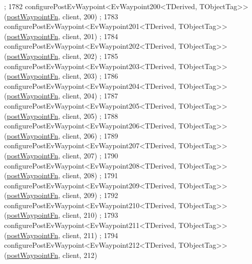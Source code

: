 \begin{DoxyCode}
      ;
1782     configurePostEvWaypoint<EvWaypoint200<TDerived, TObjectTag>>(\hyperlink{classcl__move__base__z_1_1WaypointEventDispatcher_a964a57fcce5d48ec60243230722d8dd7}{postWaypointFn}, client, 200)
      ;
1783     configurePostEvWaypoint<EvWaypoint201<TDerived, TObjectTag>>(\hyperlink{classcl__move__base__z_1_1WaypointEventDispatcher_a964a57fcce5d48ec60243230722d8dd7}{postWaypointFn}, client, 201)
      ;
1784     configurePostEvWaypoint<EvWaypoint202<TDerived, TObjectTag>>(\hyperlink{classcl__move__base__z_1_1WaypointEventDispatcher_a964a57fcce5d48ec60243230722d8dd7}{postWaypointFn}, client, 202)
      ;
1785     configurePostEvWaypoint<EvWaypoint203<TDerived, TObjectTag>>(\hyperlink{classcl__move__base__z_1_1WaypointEventDispatcher_a964a57fcce5d48ec60243230722d8dd7}{postWaypointFn}, client, 203)
      ;
1786     configurePostEvWaypoint<EvWaypoint204<TDerived, TObjectTag>>(\hyperlink{classcl__move__base__z_1_1WaypointEventDispatcher_a964a57fcce5d48ec60243230722d8dd7}{postWaypointFn}, client, 204)
      ;
1787     configurePostEvWaypoint<EvWaypoint205<TDerived, TObjectTag>>(\hyperlink{classcl__move__base__z_1_1WaypointEventDispatcher_a964a57fcce5d48ec60243230722d8dd7}{postWaypointFn}, client, 205)
      ;
1788     configurePostEvWaypoint<EvWaypoint206<TDerived, TObjectTag>>(\hyperlink{classcl__move__base__z_1_1WaypointEventDispatcher_a964a57fcce5d48ec60243230722d8dd7}{postWaypointFn}, client, 206)
      ;
1789     configurePostEvWaypoint<EvWaypoint207<TDerived, TObjectTag>>(\hyperlink{classcl__move__base__z_1_1WaypointEventDispatcher_a964a57fcce5d48ec60243230722d8dd7}{postWaypointFn}, client, 207)
      ;
1790     configurePostEvWaypoint<EvWaypoint208<TDerived, TObjectTag>>(\hyperlink{classcl__move__base__z_1_1WaypointEventDispatcher_a964a57fcce5d48ec60243230722d8dd7}{postWaypointFn}, client, 208)
      ;
1791     configurePostEvWaypoint<EvWaypoint209<TDerived, TObjectTag>>(\hyperlink{classcl__move__base__z_1_1WaypointEventDispatcher_a964a57fcce5d48ec60243230722d8dd7}{postWaypointFn}, client, 209)
      ;
1792     configurePostEvWaypoint<EvWaypoint210<TDerived, TObjectTag>>(\hyperlink{classcl__move__base__z_1_1WaypointEventDispatcher_a964a57fcce5d48ec60243230722d8dd7}{postWaypointFn}, client, 210)
      ;
1793     configurePostEvWaypoint<EvWaypoint211<TDerived, TObjectTag>>(\hyperlink{classcl__move__base__z_1_1WaypointEventDispatcher_a964a57fcce5d48ec60243230722d8dd7}{postWaypointFn}, client, 211)
      ;
1794     configurePostEvWaypoint<EvWaypoint212<TDerived, TObjectTag>>(\hyperlink{classcl__move__base__z_1_1WaypointEventDispatcher_a964a57fcce5d48ec60243230722d8dd7}{postWaypointFn}, client, 212)

\end{DoxyCode}
